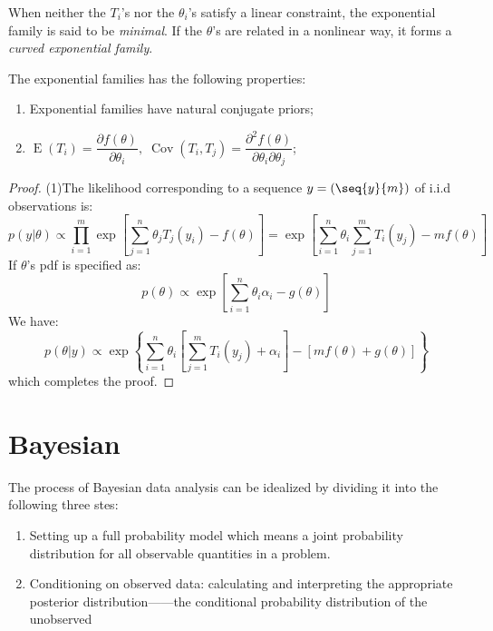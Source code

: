 \begin{definition}
	When neither the $T_i$'s nor the $\theta_i$'s satisfy a linear constraint, the exponential family is said to be \emph{minimal}. If the $\theta$'s are related in a nonlinear way, it forms a \emph{curved exponential family}.
\end{definition}
\begin{property}
	The exponential families has the following properties:
	\begin{enumerate}
		\item Exponential families have natural conjugate priors;
		\item $\operatorname{E}(T_i)=\dfrac{\partial f(\theta)}{\partial\theta_i},\;\operatorname{Cov}(T_i,T_j)=\dfrac{\partial^2f(\theta)}{\partial\theta_i\partial\theta_j}$;
	\end{enumerate}
\end{property}
\begin{proof}
	(1)The likelihood corresponding to a sequence $y = (\seq{y}{m})$ of i.i.d observations is:
	\begin{equation*}
		p(y|\theta)\propto\prod_{i=1}^{m}\exp\left[\sum_{j=1}^{n}\theta_jT_j(y_i)-f(\theta)\right]=\exp\left[\sum_{i=1}^{n}\theta_i\sum_{j=1}^{m}T_i(y_j)-mf(\theta)\right]
	\end{equation*}
	If $\theta$'s pdf is specified as:
	\begin{equation*}
		p(\theta)\propto\exp\left[\sum_{i=1}^{n}\theta_i\alpha_i-g(\theta)\right]
	\end{equation*}
	We have:
	\begin{equation*}
		p(\theta|y)\propto\exp\left\{\sum_{i=1}^{n}\theta_i\left[\sum_{j=1}^{m}T_i(y_j)+\alpha_i\right]-[mf(\theta)+g(\theta)]\right\}
	\end{equation*}
	which completes the proof.
\end{proof}


\section{Bayesian}
The process of Bayesian data analysis can be idealized by dividing it into the following three stes:
\begin{enumerate}
	\item Setting up a full probability model which means a joint probability distribution for all observable quantities in a problem.
	\item  Conditioning on observed data: calculating and interpreting the appropriate posterior distribution——the conditional probability distribution of the unobserved
\end{enumerate}

